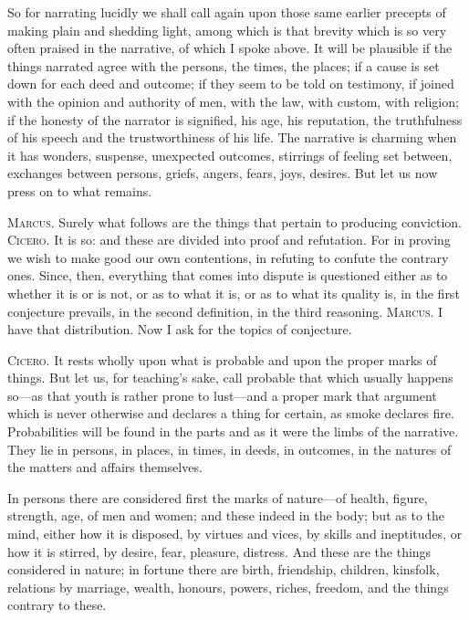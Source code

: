  So for narrating lucidly we shall call again upon those same earlier precepts of making plain and shedding light, among which is that brevity which is so very often praised in the narrative, of which I spoke above. It will be plausible if the things narrated agree with the persons, the times, the places; if a cause is set down for each deed and outcome; if they seem to be told on testimony, if joined with the opinion and authority of men, with the law, with custom, with religion; if the honesty of the narrator is signified, his age, his reputation, the truthfulness of his speech and the trustworthiness of his life. The narrative is charming when it has wonders, suspense, unexpected outcomes, stirrings of feeling set between, exchanges between persons, griefs, angers, fears, joys, desires. But let us now press on to what remains.

 \textsc{Marcus.} Surely what follows are the things that pertain to producing conviction. \textsc{Cicero.} It is so: and these are divided into proof and refutation. For in proving we wish to make good our own contentions, in refuting to confute the contrary ones. Since, then, everything that comes into dispute is questioned either as to whether it is or is not, or as to what it is, or as to what its quality is, in the first conjecture prevails, in the second definition, in the third reasoning. \textsc{Marcus.} I have that distribution. Now I ask for the topics of conjecture.

 \textsc{Cicero.} It rests wholly upon what is probable and upon the proper marks of things. But let us, for teaching's sake, call probable that which usually happens so—as that youth is rather prone to lust—and a proper mark that argument which is never otherwise and declares a thing for certain, as smoke declares fire. Probabilities will be found in the parts and as it were the limbs of the narrative. They lie in persons, in places, in times, in deeds, in outcomes, in the natures of the matters and affairs themselves.

 In persons there are considered first the marks of nature—of health, figure, strength, age, of men and women; and these indeed in the body; but as to the mind, either how it is disposed, by virtues and vices, by skills and ineptitudes, or how it is stirred, by desire, fear, pleasure, distress. And these are the things considered in nature; in fortune there are birth, friendship, children, kinsfolk, relations by marriage, wealth, honours, powers, riches, freedom, and the things contrary to these.

